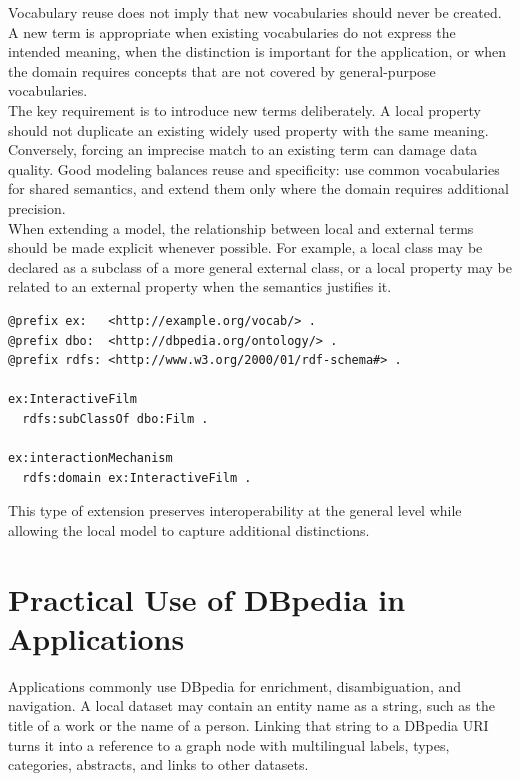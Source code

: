 \documentclass{scrbook}
\begin{document}
	Vocabulary reuse does not imply that new vocabularies should never be created. A new term is appropriate when existing vocabularies do not express the intended meaning, when the distinction is important for the application, or when the domain requires concepts that are not covered by general-purpose vocabularies.\\
	
	The key requirement is to introduce new terms deliberately. A local property should not duplicate an existing widely used property with the same meaning. Conversely, forcing an imprecise match to an existing term can damage data quality. Good modeling balances reuse and specificity: use common vocabularies for shared semantics, and extend them only where the domain requires additional precision.\\
	
	When extending a model, the relationship between local and external terms should be made explicit whenever possible. For example, a local class may be declared as a subclass of a more general external class, or a local property may be related to an external property when the semantics justifies it.
	
	\begin{lstlisting}
@prefix ex:   <http://example.org/vocab/> .
@prefix dbo:  <http://dbpedia.org/ontology/> .
@prefix rdfs: <http://www.w3.org/2000/01/rdf-schema#> .
	
ex:InteractiveFilm
  rdfs:subClassOf dbo:Film .
	
ex:interactionMechanism
  rdfs:domain ex:InteractiveFilm .
	\end{lstlisting}
	
	This type of extension preserves interoperability at the general level while allowing the local model to capture additional distinctions.
	
	\section{Practical Use of DBpedia in Applications}
	
	Applications commonly use DBpedia for enrichment, disambiguation, and navigation. A local dataset may contain an entity name as a string, such as the title of a work or the name of a person. Linking that string to a DBpedia URI turns it into a reference to a graph node with multilingual labels, types, categories, abstracts, and links to other datasets.\\
	
\end{document}
